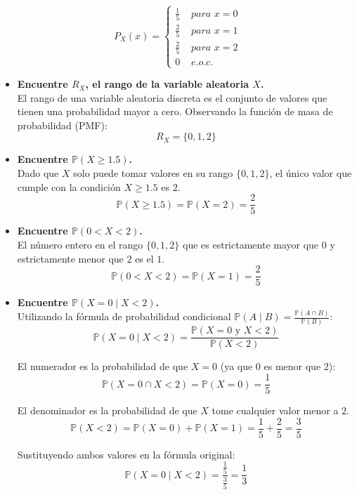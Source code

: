 \documentclass[10pt,a4paper]{book}
\begin{document}
\[
P_X(x)=
\begin{cases}
\frac{1}{5} & \textit{ para } x=0 \\
\frac{2}{5} & \textit{ para } x=1 \\
\frac{2}{5} & \textit{ para } x=2 \\
 0 & \textit{ e.o.c. } 
\end{cases}
\]

\begin{itemize}
    \item[\textbf{a)}] \textbf{Encuentre $R_X$, el rango de la variable aleatoria $X$.} \\
    El rango de una variable aleatoria discreta es el conjunto de valores que tienen una probabilidad mayor a cero. Observando la función de masa de probabilidad (PMF):
    \[ R_X = \{0, 1, 2\} \]

    \item[\textbf{b)}] \textbf{Encuentre $\mathbb{P}(X \ge 1.5)$.} \\
    Dado que $X$ solo puede tomar valores en su rango $\{0, 1, 2\}$, el único valor que cumple con la condición $X \ge 1.5$ es $2$.
    \[ \mathbb{P}(X \ge 1.5) = \mathbb{P}(X = 2) = \frac{2}{5} \]

    \item[\textbf{c)}] \textbf{Encuentre $\mathbb{P}(0 < X < 2)$.} \\
    El número entero en el rango $\{0, 1, 2\}$ que es estrictamente mayor que $0$ y estrictamente menor que $2$ es el $1$.
    \[ \mathbb{P}(0 < X < 2) = \mathbb{P}(X = 1) = \frac{2}{5} \]

    \item[\textbf{d)}] \textbf{Encuentre $\mathbb{P}(X = 0 \mid X < 2)$.} \\
    Utilizando la fórmula de probabilidad condicional $\mathbb{P}(A \mid B) = \frac{\mathbb{P}(A \cap B)}{\mathbb{P}(B)}$:
    \[ \mathbb{P}(X = 0 \mid X < 2) = \frac{\mathbb{P}(X = 0 \text{ y } X < 2)}{\mathbb{P}(X < 2)} \]
    
    El numerador es la probabilidad de que $X = 0$ (ya que $0$ es menor que $2$):
    \[ \mathbb{P}(X = 0 \cap X < 2) = \mathbb{P}(X = 0) = \frac{1}{5} \]
    
    El denominador es la probabilidad de que $X$ tome cualquier valor menor a $2$.
    \[ \mathbb{P}(X < 2) = \mathbb{P}(X = 0) + \mathbb{P}(X = 1) = \frac{1}{5} + \frac{2}{5} = \frac{3}{5} \]
    
    Sustituyendo ambos valores en la fórmula original:
    \[ \mathbb{P}(X = 0 \mid X < 2) = \frac{\frac{1}{5}}{\frac{3}{5}} = \frac{1}{3} \]
\end{itemize}
\end{document}
